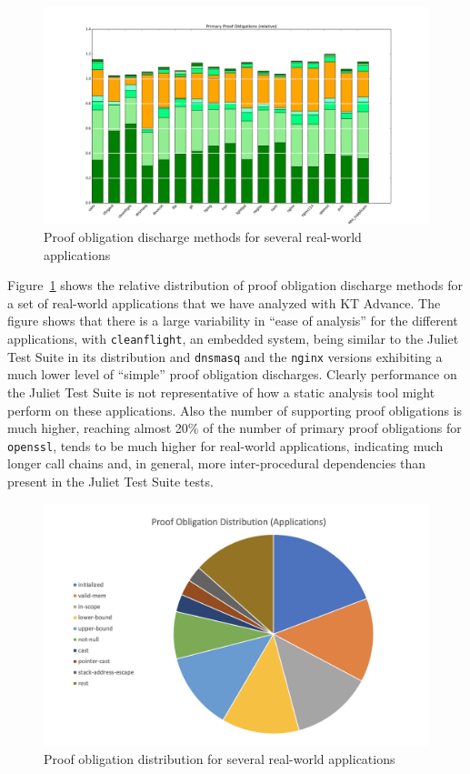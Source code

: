 \documentclass[11pt]{article}
\begin{document}
\begin{figure}[h]
\begin{center}
\includegraphics[width=\textwidth]{projects_fractions.png}
\end{center}
\caption{\label{fig:appstats}Proof obligation discharge methods for several real-world applications}
\end{figure}

Figure~\ref{fig:appstats} shows the relative distribution of proof obligation discharge
methods for a set of real-world applications that we have analyzed with KT Advance. The
figure shows that there is a large variability in ``ease of analysis'' for the different
applications, with {\tt cleanflight}, an embedded system, being similar to the Juliet Test
Suite in its distribution and {\tt dnsmasq} and the {\tt nginx} versions exhibiting a much
lower level of ``simple'' proof obligation discharges. Clearly performance on the Juliet
Test Suite is not representative of how a static analysis tool might perform  on these 
applications. Also the number of supporting proof obligations is much higher, reaching
almost 20\% of the number of primary proof obligations for {\tt openssl}, tends to be
much higher for real-world applications, indicating much longer call chains and, in
general, more inter-procedural dependencies than present in the Juliet Test Suite tests.

\begin{figure}[h]
\begin{center}
\includegraphics[width=.8\textwidth]{pie_apps.png}
\end{center}
\caption{\label{fig:pie}Proof obligation distribution for several real-world applications}
\end{figure}
\end{document}
